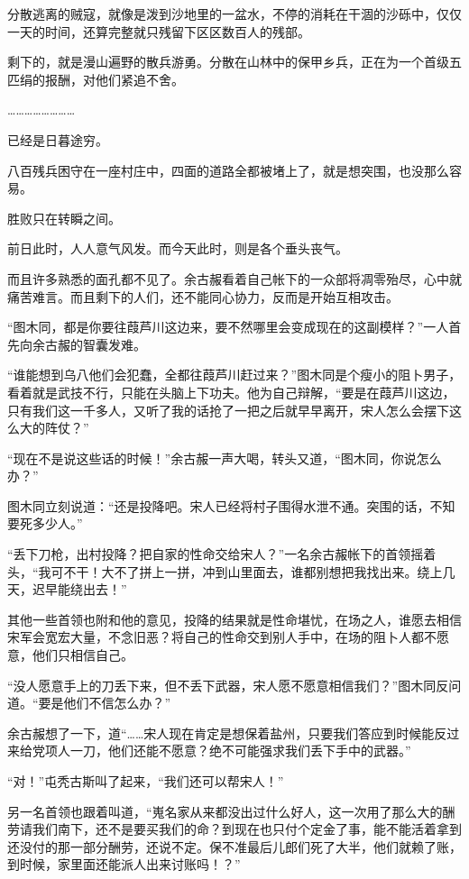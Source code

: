 分散逃离的贼寇，就像是泼到沙地里的一盆水，不停的消耗在干涸的沙砾中，仅仅一天的时间，还算完整就只残留下区区数百人的残部。

剩下的，就是漫山遍野的散兵游勇。分散在山林中的保甲乡兵，正在为一个首级五匹绢的报酬，对他们紧追不舍。

……………………

已经是日暮途穷。

八百残兵困守在一座村庄中，四面的道路全都被堵上了，就是想突围，也没那么容易。

胜败只在转瞬之间。

前日此时，人人意气风发。而今天此时，则是各个垂头丧气。

而且许多熟悉的面孔都不见了。余古赧看着自己帐下的一众部将凋零殆尽，心中就痛苦难言。而且剩下的人们，还不能同心协力，反而是开始互相攻击。

“图木同，都是你要往葭芦川这边来，要不然哪里会变成现在的这副模样？”一人首先向余古赧的智囊发难。

“谁能想到乌八他们会犯蠢，全都往葭芦川赶过来？”图木同是个瘦小的阻卜男子，看着就是武技不行，只能在头脑上下功夫。他为自己辩解，“要是在葭芦川这边，只有我们这一千多人，又听了我的话抢了一把之后就早早离开，宋人怎么会摆下这么大的阵仗？”

“现在不是说这些话的时候！”余古赧一声大喝，转头又道，“图木同，你说怎么办？”

图木同立刻说道：“还是投降吧。宋人已经将村子围得水泄不通。突围的话，不知要死多少人。”

“丢下刀枪，出村投降？把自家的性命交给宋人？”一名余古赧帐下的首领摇着头，“我可不干！大不了拼上一拼，冲到山里面去，谁都别想把我找出来。绕上几天，迟早能绕出去！”

其他一些首领也附和他的意见，投降的结果就是性命堪忧，在场之人，谁愿去相信宋军会宽宏大量，不念旧恶？将自己的性命交到别人手中，在场的阻卜人都不愿意，他们只相信自己。

“没人愿意手上的刀丢下来，但不丢下武器，宋人愿不愿意相信我们？”图木同反问道。“要是他们不信怎么办？”

余古赧想了一下，道“……宋人现在肯定是想保着盐州，只要我们答应到时候能反过来给党项人一刀，他们还能不愿意？绝不可能强求我们丢下手中的武器。”

“对！”屯秃古斯叫了起来，“我们还可以帮宋人！”

另一名首领也跟着叫道，“嵬名家从来都没出过什么好人，这一次用了那么大的酬劳请我们南下，还不是要买我们的命？到现在也只付个定金了事，能不能活着拿到还没付的那一部分酬劳，还说不定。保不准最后儿郎们死了大半，他们就赖了账，到时候，家里面还能派人出来讨账吗！？”

